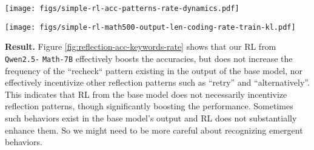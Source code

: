 \begin{figure*}[htbp]
    \centering
    \texttt{[image: figs/simple-rl-acc-patterns-rate-dynamics.pdf]}
    \vspace{-20pt}
    \caption{Dynamics of accuracies and reflection keyword rates on different benchmarks during our RL from the base model \texttt{Qwen2.5-Math-7B}. We do not see the keyword rates of ``wait'', ``alternatively'', and ``recheck'' get significantly improved during the RL training even though the accuracy is steadily increasing. }
    \label{fig:reflection-acc-keywords-rate}
\end{figure*}


\begin{figure*}[htbp]
    \centering
    \texttt{[image: figs/simple-rl-math500-output-len-coding-rate-train-kl.pdf]}
    \vspace{-20pt}
    \caption{Dynamics of the output token lengths and the coding rate on MATH-500 and the KL divergence of the policy over the base model on MATH Lv3-5 (training data) during our RL from \texttt{Qwen2.5-Math-7B}.}
    \vspace{-10pt}
    \label{fig:code-rate-output-len}
\end{figure*}

\noindent\textbf{Result.} Figure \ref{fig:reflection-acc-keywords-rate} shows that our RL from \texttt{Qwen2.5-} \texttt{Math-7B} effectively boosts the accuracies, but does not increase the frequency of the ``recheck`` pattern existing in the output of the base model,
nor effectively incentivize other reflection patterns such as ``retry'' and ``alternatively''. This indicates that RL from the base model does not necessarily incentivize reflection patterns, though significantly boosting the performance. Sometimes such behaviors exist in the base model's output and RL does not substantially enhance them. So we might need to be more careful about recognizing emergent behaviors.


